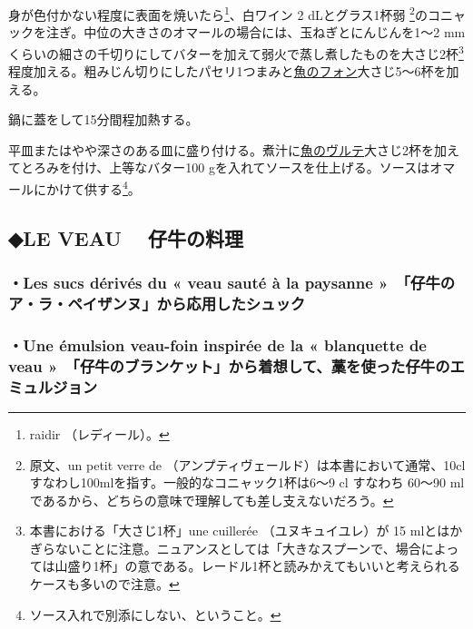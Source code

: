 身が色付かない程度に表面を焼いたら\footnote{raidir （レディール）。}、白ワイン
2 dLとグラス1杯弱 \footnote{原文、un petit verre de
  （アンプティヴェールド）は本書において通常、10clすなわし100mlを指す。一般的なコニャック1杯は6〜9
  cl すなわち 60〜90 ml
  であるから、どちらの意味で理解しても差し支えないだろう。}のコニャックを注ぎ。中位の大きさのオマールの場合には、玉ねぎとにんじんを1〜2
mmくらいの細さの千切りにしてバターを加えて弱火で蒸し煮したものを大さじ2杯\footnote{本書における「大さじ1杯」une
  cuillerée （ユヌキュイユレ）が 15
  mlとはかぎらないことに注意。ニュアンスとしては「大きなスプーンで、場合によっては山盛り1杯」の意である。レードル1杯と読みかえてもいいと考えられるケースも多いので注意。}程度加える。粗みじん切りにしたパセリ1つまみと\protect\hyperlink{fumet-de-poisson}{魚のフォン}大さじ5〜6杯を加える。

鍋に蓋をして15分間程加熱する。

平皿またはやや深さのある皿に盛り付ける。煮汁に\protect\hyperlink{veloute-de-poisson}{魚のヴルテ}大さじ2杯を加えてとろみを付け、上等なバター100
gを入れてソースを仕上げる。ソースはオマールにかけて供する\footnote{ソース入れで別添にしない、ということ。}。

\hypertarget{le-veau-ux4ed4ux725bux306eux6599ux7406}{%
\subsection{◆LE VEAU
　仔牛の料理}\label{le-veau-ux4ed4ux725bux306eux6599ux7406}}

\hypertarget{les-sucs-duxe9rivuxe9s-du-veau-sautuxe9-uxe0-la-paysanne-ux4ed4ux725bux306eux30a2ux30e9ux30daux30a4ux30b6ux30f3ux30ccux304bux3089ux5fdcux7528ux3057ux305fux30b7ux30e5ux30c3ux30af}{%
\subsubsection{・Les sucs dérivés du « veau sauté à la paysanne
»　「仔牛のア・ラ・ペイザンヌ」から応用したシュック}\label{les-sucs-duxe9rivuxe9s-du-veau-sautuxe9-uxe0-la-paysanne-ux4ed4ux725bux306eux30a2ux30e9ux30daux30a4ux30b6ux30f3ux30ccux304bux3089ux5fdcux7528ux3057ux305fux30b7ux30e5ux30c3ux30af}}

\hypertarget{une-uxe9mulsion-veau-foin-inspiruxe9e-de-la-blanquette-de-veau-ux4ed4ux725bux306eux30d6ux30e9ux30f3ux30b1ux30c3ux30c8ux304bux3089ux7740ux60f3ux3057ux3066ux85c1ux3092ux4f7fux3063ux305fux4ed4ux725bux306eux30a8ux30dfux30e5ux30ebux30b8ux30e7ux30f3}{%
\subsubsection{・Une émulsion veau-foin inspirée de la « blanquette de
veau
»　「仔牛のブランケット」から着想して、藁を使った仔牛のエミュルジョン}\label{une-uxe9mulsion-veau-foin-inspiruxe9e-de-la-blanquette-de-veau-ux4ed4ux725bux306eux30d6ux30e9ux30f3ux30b1ux30c3ux30c8ux304bux3089ux7740ux60f3ux3057ux3066ux85c1ux3092ux4f7fux3063ux305fux4ed4ux725bux306eux30a8ux30dfux30e5ux30ebux30b8ux30e7ux30f3}}

